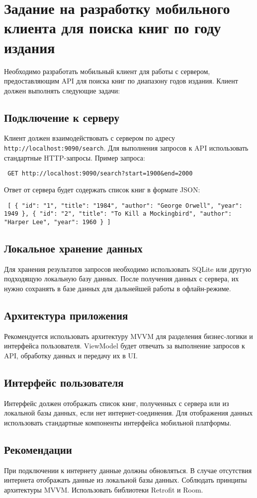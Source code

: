 \section{Задание на разработку мобильного клиента для поиска книг по году издания}

Необходимо разработать мобильный клиент для работы с сервером, предоставляющим API для поиска книг по диапазону годов издания. Клиент должен выполнять следующие задачи:

\subsection{Подключение к серверу} Клиент должен взаимодействовать с сервером по адресу \texttt{http://localhost:9090/search}. Для выполнения запросов к API использовать стандартные HTTP-запросы. Пример запроса:

\begin{verbatim} GET http://localhost:9090/search?start=1900&end=2000 \end{verbatim}

Ответ от сервера будет содержать список книг в формате JSON:

\begin{verbatim} [ { "id": "1", "title": "1984", "author": "George Orwell", "year": 1949 }, { "id": "2", "title": "To Kill a Mockingbird", "author": "Harper Lee", "year": 1960 } ] \end{verbatim}

\subsection{Локальное хранение данных} Для хранения результатов запросов необходимо использовать SQLite или другую подходящую локальную базу данных. После получения данных с сервера, их нужно сохранять в базе данных для дальнейшей работы в офлайн-режиме.

\subsection{Архитектура приложения} Рекомендуется использовать архитектуру MVVM для разделения бизнес-логики и интерфейса пользователя. ViewModel будет отвечать за выполнение запросов к API, обработку данных и передачу их в UI.

\subsection{Интерфейс пользователя} Интерфейс должен отображать список книг, полученных с сервера или из локальной базы данных, если нет интернет-соединения. Для отображения данных использовать стандартные компоненты интерфейса мобильной платформы.

\subsection{Рекомендации}

При подключении к интернету данные должны обновляться.
В случае отсутствия интернета отображать данные из локальной базы данных.
Соблюдать принципы архитектуры MVVM.
Использовать библиотеки Retrofit и Room.